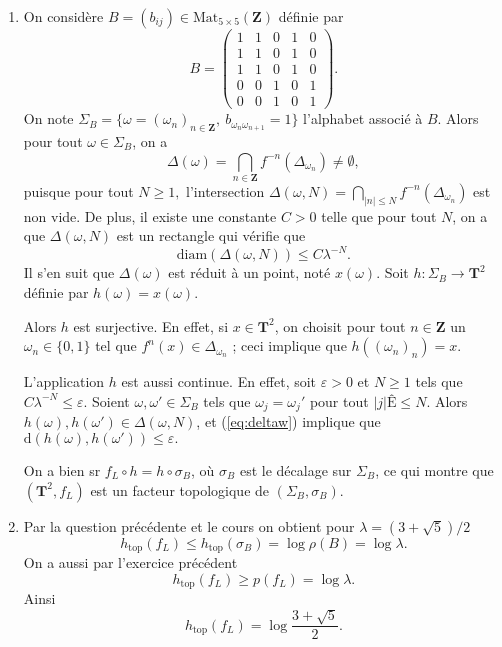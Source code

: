\documentclass[a4paper,12pt,openany]{article}
\theoremstyle{plain}
\theoremstyle{definition}
\newcommand{\dd}{\mathrm{d}}
\newcommand{\T}{\mathbf{T}}
\newcommand{\Z}{\mathbf{Z}}
\newcommand{\htop}{h_\mathrm{top}}
\begin{document}
\vspace{0.6cm}


 \vspace{1.5mm} 

\begin{enumerate}
\item On consid\`ere $B = (b_{ij}) \in \mathrm{Mat}_{5\times 5}(\Z)$ d\'efinie par
$$
B = \begin{pmatrix}
1 & 1 & 0 & 1 & 0 \\
1 & 1 & 0 & 1 & 0 \\
1 & 1 & 0 & 1 & 0 \\
0 & 0 & 1 & 0 & 1 \\
0 & 0 & 1 & 0 & 1
\end{pmatrix}.
$$
On note 
$\Sigma_B = \{\omega = (\omega_n)_{n \in \Z},~ b_{\omega_n \omega_{n+1}} = 1\}$
l'alphabet associ\'e \`a $B$. Alors pour tout $\omega \in \Sigma_B$, on a 
$$
\Delta(\omega) = \bigcap_{n \in \Z} f^{-n}( \Delta_{\omega_n}) \neq \emptyset,
$$
puisque pour tout $N \geq 1,$ l'intersection $ \Delta(\omega, N) = \bigcap_{|n|\leq N} f^{-n}(\Delta_{\omega_n})$ est non vide. De plus, il existe une constante $C>0$ telle que pour tout $N$, on a que $\Delta(\omega, N)$ est un rectangle qui v\'erifie que
\begin{equation}\label{eq:deltaw}
\mathrm{diam}(\Delta(\omega, N)) \leq C \lambda^{-N}.
\end{equation}
Il s'en suit que $\Delta(\omega)$ est r\'eduit \`a un point, not\'e $x(\omega)$. Soit $h : \Sigma_B \to \T^2$ d\'efinie par $h(\omega) = x(\omega).$ 

Alors $h$ est surjective. En effet, si $x \in \T^2$, on choisit pour tout $n \in \Z$ un $\omega_n \in \{0,1\}$ tel que $f^n(x) \in \Delta_{\omega_n}$ ; ceci implique que $h((\omega_n)_n) = x$.

L'application $h$ est aussi continue. En effet, soit $\varepsilon > 0$ et $N \geq 1$ tels que $C\lambda^{-N} \leq \varepsilon.$ Soient $\omega, \omega' \in \Sigma_B$ tels que $\omega_j = \omega_j'$ pour tout $|j|Ê\leq N$. Alors $h(\omega), h(\omega') \in \Delta(\omega, N)$, et (\ref{eq:deltaw}) implique que $\dd(h(\omega), h(\omega')) \leq \varepsilon.$

On a bien sr $f_L\circ h = h \circ \sigma_B$, o\`u $\sigma_B$ est le d\'ecalage sur $\Sigma_B$, ce qui montre que $(\T^2, f_L)$ est un facteur topologique de $(\Sigma_B, \sigma_B)$.

\item Par la question pr\'ec\'edente et le cours on obtient pour $\lambda = (3 + \sqrt{5})/2$
$$
\htop(f_L) \leq \htop(\sigma_B) = \log \rho(B) = \log \lambda.
$$
On a aussi par l'exercice pr\'ec\'edent 
$$
\htop(f_L) \geq p(f_L) = \log \lambda.
$$
Ainsi 
$$\htop(f_L) = \log \frac{3 + \sqrt{5}}{2}.$$
\end{enumerate}
\end{document}

